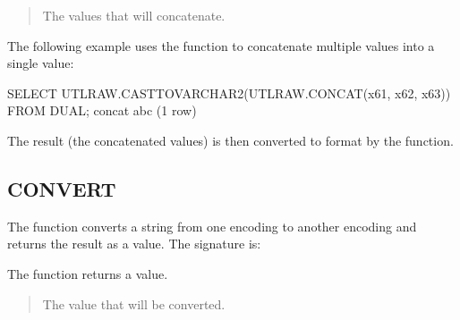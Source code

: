 \documentclass[letterpaper,10pt,english,openany,oneside]{sphinxmanual}
\begin{document}

\begin{quote}

The  values that  will concatenate.
\end{quote}


The following example uses the  function to concatenate multiple
 values into a single  value:

%
\begin{sphinxVerbatim}[commandchars=\\\{\}]
\textbar{} SELECT UTL\PYGZus{}RAW.CAST\PYGZus{}TO\PYGZus{}VARCHAR2(UTL\PYGZus{}RAW.CONCAT(\PYGZsq{}\PYGZbs{}x61\PYGZsq{}, \PYGZsq{}\PYGZbs{}x62\PYGZsq{},
\textbar{} \PYGZsq{}\PYGZbs{}x63\PYGZsq{})) FROM DUAL;
\textbar{} concat
\textbar{} \PYGZhy{}\PYGZhy{}\PYGZhy{}\PYGZhy{}\PYGZhy{}\PYGZhy{}\PYGZhy{}\PYGZhy{}
\textbar{} abc
\textbar{} (1 row)
\end{sphinxVerbatim}

The result (the concatenated values) is then converted to 
format by the  function.

\newpage


\subsection{CONVERT}
\label{\detokenize{utl_raw:convert}}
The  function converts a string from one encoding to another
encoding and returns the result as a  value. The signature is:
\begin{quote}

\end{quote}

The function returns a  value.


\begin{quote}

The  value that will be converted.
\end{quote}
\end{document}
